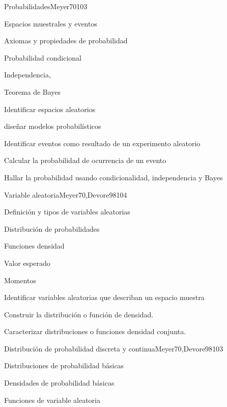 \begin{syllabus}
\begin{unit}{Probabilidades}{}{Meyer70}{10}{3}
\begin{topics}
      \item Espacios muestrales y eventos
      \item Axiomas y propiedades de probabilidad
      \item Probabilidad condicional
      \item Independencia,
      \item Teorema de Bayes
   \end{topics}
   \begin{learningoutcomes}
      \item Identificar espacios aleatorios
      \item diseñar  modelos probabilísticos
      \item Identificar eventos como resultado de un experimento aleatorio
      \item Calcular la probabilidad de ocurrencia de un evento
      \item Hallar la probabilidad usando condicionalidad, independencia y Bayes
   \end{learningoutcomes}
\end{unit}

\begin{unit}{Variable aleatoria}{}{Meyer70,Devore98}{10}{4}
\begin{topics}
      \item Definición y tipos de variables aleatorias
      \item Distribución de probabilidades
      \item Funciones densidad
      \item Valor esperado
      \item Momentos
   \end{topics}

   \begin{learningoutcomes}
      \item Identificar variables aleatorias que describan un espacio muestra
      \item Construir la distribución o función de densidad.
      \item Caracterizar distribuciones o funciones densidad conjunta.
   \end{learningoutcomes}
\end{unit}

\begin{unit}{Distribución de probabilidad discreta y continua}{}{Meyer70,Devore98}{10}{3}
\begin{topics}
      \item Distribuciones de probabilidad básicas
      \item Densidades de probabilidad básicas
      \item Funciones de variable aleatoria
   \end{topics}


\end{unit}
\end{syllabus}
